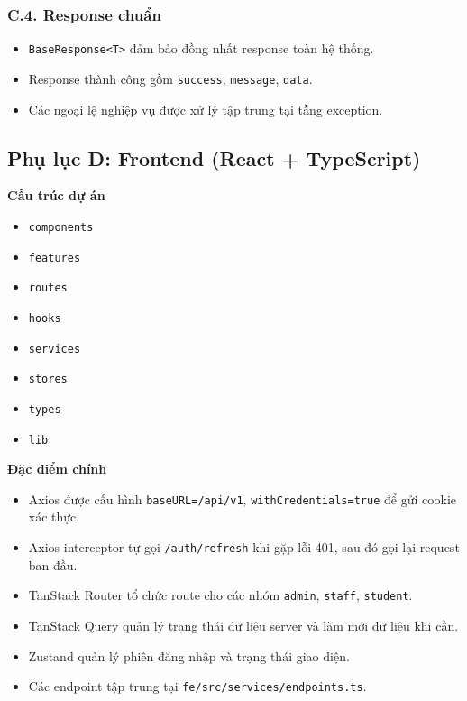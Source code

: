 \documentclass[13pt,a4paper]{extarticle}
\numberwithin{figure}{section}
\numberwithin{table}{section}
\begin{document}
	\subsubsection*{C.4. Response chuẩn}
	\begin{itemize}
		\item \texttt{BaseResponse\textless T\textgreater} đảm bảo đồng nhất response toàn hệ thống.
		\item Response thành công gồm \texttt{success}, \texttt{message}, \texttt{data}.
		\item Các ngoại lệ nghiệp vụ được xử lý tập trung tại tầng exception.
	\end{itemize}
	
	\subsection*{Phụ lục D: Frontend (React + TypeScript)}
	
	\noindent
	\textbf{Cấu trúc dự án}
	\begin{itemize}
		\item \texttt{components}
		\item \texttt{features}
		\item \texttt{routes}
		\item \texttt{hooks}
		\item \texttt{services}
		\item \texttt{stores}
		\item \texttt{types}
		\item \texttt{lib}
	\end{itemize}
	
	\noindent
	\textbf{Đặc điểm chính}
	\begin{itemize}
		\item Axios được cấu hình \texttt{baseURL=/api/v1}, \texttt{withCredentials=true} để gửi cookie xác thực.
		\item Axios interceptor tự gọi \texttt{/auth/refresh} khi gặp lỗi 401, sau đó gọi lại request ban đầu.
		\item TanStack Router tổ chức route cho các nhóm \texttt{admin}, \texttt{staff}, \texttt{student}.
		\item TanStack Query quản lý trạng thái dữ liệu server và làm mới dữ liệu khi cần.
		\item Zustand quản lý phiên đăng nhập và trạng thái giao diện.
		\item Các endpoint tập trung tại \texttt{fe/src/services/endpoints.ts}.
	\end{itemize}
	
\end{document}
